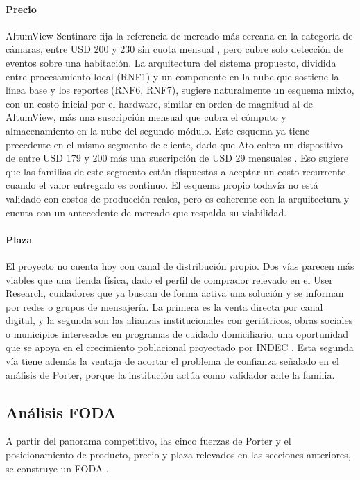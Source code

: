 \paragraph{Precio}
AltumView Sentinare fija la referencia de mercado más cercana en la categoría de cámaras, entre USD 200 y 230 sin cuota mensual \parencite{AltumView}, pero cubre solo detección de eventos sobre una habitación.
La arquitectura del sistema propuesto, dividida entre procesamiento local (RNF1) y un componente en la nube que sostiene la línea base y los reportes (RNF6, RNF7), sugiere naturalmente un esquema mixto, con un costo inicial por el hardware, similar en orden de magnitud al de AltumView, más una suscripción mensual que cubra el cómputo y almacenamiento en la nube del segundo módulo.
Este esquema ya tiene precedente en el mismo segmento de cliente, dado que Ato cobra un dispositivo de entre USD 179 y 200 más una suscripción de USD 29 mensuales \parencite{Ato}.
Eso sugiere que las familias de este segmento están dispuestas a aceptar un costo recurrente cuando el valor entregado es continuo.
El esquema propio todavía no está validado con costos de producción reales, pero es coherente con la arquitectura y cuenta con un antecedente de mercado que respalda su viabilidad.

\paragraph{Plaza}
El proyecto no cuenta hoy con canal de distribución propio.
Dos vías parecen más viables que una tienda física, dado el perfil de comprador relevado en el User Research, cuidadores que ya buscan de forma activa una solución y se informan por redes o grupos de mensajería.
La primera es la venta directa por canal digital, y la segunda son las alianzas institucionales con geriátricos, obras sociales o municipios interesados en programas de cuidado domiciliario, una oportunidad que se apoya en el crecimiento poblacional proyectado por INDEC \parencite{INDEC2024}.
Esta segunda vía tiene además la ventaja de acortar el problema de confianza señalado en el análisis de Porter, porque la institución actúa como validador ante la familia.

\subsection{Análisis FODA}
\label{sec:foda}

A partir del panorama competitivo, las cinco fuerzas de Porter y el posicionamiento de producto, precio y plaza relevados en las secciones anteriores, se construye un FODA \parencite{Gurel2017}.

